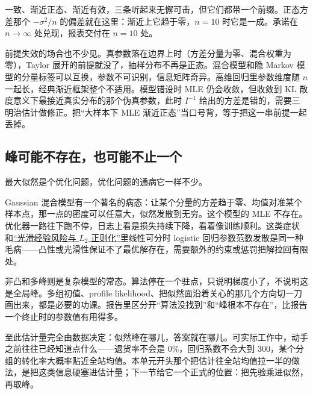 一致、渐近正态、渐近有效，三条听起来无懈可击，但它们都带一个前缀。正态方差那个 \(-\sigma^2/n\) 的偏差就在这里：渐近上它趋于零，\(n=10\) 时它是一成。承诺在 \(n\to\infty\) 处兑现，报表交付在 \(n=10\) 处。

前提失效的场合也不少见。真参数落在边界上时（方差分量为零、混合权重为零），Taylor 展开的前提就没了，抽样分布不再是正态。混合模型和隐 Markov 模型的分量标签可以互换，参数不可识别，信息矩阵奇异。高维回归里参数维度随 \(n\) 一起长，经典渐近框架整个不适用。模型错设时 MLE 仍会收敛，但收敛到 KL 散度意义下最接近真实分布的那个伪真参数，此时 \(I^{-1}\) 给出的方差是错的，需要三明治估计做修正。把``大样本下 MLE 渐近正态''当口号背，等于把这一串前提一起丢掉。

\subsection{峰可能不存在，也可能不止一个}

最大似然是个优化问题，优化问题的通病它一样不少。

Gaussian 混合模型有一个著名的病态：让某个分量的方差趋于零、均值对准某个样本点，那一点的密度可以任意大，似然发散到无穷。这个模型的 MLE 不存在。优化器一路往下跑不停，日志上看是损失持续下降，看着像训练顺利。这类症状和\hyperref[sec:09-Convex-Optimization/07-Applications/01]{``光滑经验风险与 \(L_2\) 正则化''}里线性可分时 logistic 回归参数范数发散是同一种毛病——凸性或光滑性保证不了最优解存在，需要额外的约束或惩罚把解拉回有限处。

非凸和多峰则是复杂模型的常态。算法停在一个驻点，只说明梯度小了，不说明这是全局峰。多组初值、profile likelihood、把似然面沿着关心的那几个方向切一刀画出来，都是必要的功课。报告里区分开``算法没找到''和``峰根本不存在''，比报告一个终止时的参数值有用得多。

至此估计量完全由数据决定：似然峰在哪儿，答案就在哪儿。可实际工作中，动手之前往往已经知道点什么——退货率不会是 \(0\%\)，回归系数不会大到 \(300\)，某个分组的转化率大概率贴近全站均值。本单元开头那个把估计往全站均值拉一半的做法，是把这类信息硬塞进估计量；下一节给它一个正式的位置：把先验乘进似然，再取峰。
